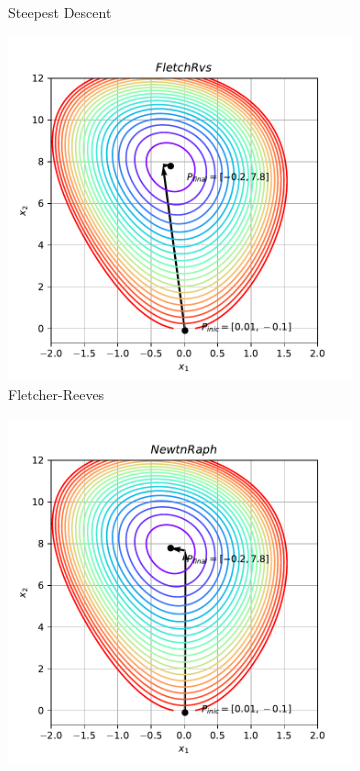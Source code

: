 \documentclass[10pt, a4paper]{article}
\begin{document}
\begin{figure}[htpb]
\begin{subfigure}[b]{0.32\textwidth}
    \caption{Steepest Descent}
    \label{fig:q2a_steepest}
  \end{subfigure}
  \hfill
  \begin{subfigure}[b]{0.32\textwidth}
    \centering
    \includegraphics[width=\textwidth]{images/q2a_FletchRvs.pdf}
    \caption{Fletcher-Reeves}
    \label{fig:q2a_fletchrvs}
  \end{subfigure}
  \hfill
  \begin{subfigure}[b]{0.32\textwidth}
    \centering
    \includegraphics[width=\textwidth]{images/q2a_NewtnRaph.pdf}

\end{subfigure}
\end{figure}
\end{document}
